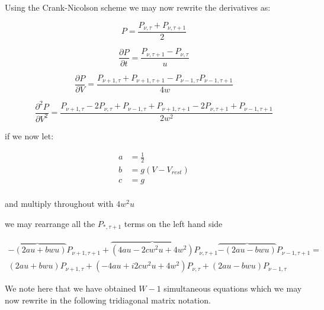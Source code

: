 \documentclass[10pt]{article}
\begin{document}
Using the Crank-Nicolson scheme we  may now rewrite the derivatives as:


\begin{equation}
    P = \frac{P_{\nu,\tau} + P_{\nu,\tau + 1}}{2}
\end{equation}

\begin{equation}
    \frac{\partial P}{\partial t} = \frac{P_{\nu,\tau +1 } -
    P_{\nu,\tau}}{u}
\end{equation}

\begin{equation}
    \frac{\partial P}{\partial V} = 
    \frac{P_{\nu +1,\tau } + P_{\nu +1,\tau +1 } -
    P_{\nu - 1,\tau } P_{\nu -1,\tau +1}}
    {4w}
\end{equation}

\begin{equation}
    \frac{\partial^2 P}{\partial V^2} = 
    \frac{P_{\nu+1,\tau} - 2 P_{\nu,\tau} + P_{\nu-1,\tau} +
    P_{\nu+1,\tau+1} - 2 P_{\nu,\tau+1} + P_{\nu-1,\tau+1}}
    {2w^2}
\end{equation}

if we now let:

\begin{align*}
a &= \frac{1}{2} \\
b &= g(V - V_{rest}) \\
c &= g \\
\end{align*}

and multiply throughout with $4w^2u$

we may rearrange all the $P_{*,\tau+1} $ terms on the left hand side

\begin{multline}
    \overbrace{-(2au+bwu)} P_{\nu+1,\tau+1} + 
    \overbrace{(4au - 2cw^2u + 4w^2)} P_{\nu,\tau+1} 
    \overbrace{-(2au-bwu)} P_{\nu-1,\tau+1} 
    =  \\
    (2au+bwu) P_{\nu+1,\tau} +  
    (-4au +i  2cw^2u + 4w^2) P_{\nu,\tau} + 
    (2au-bwu) P_{\nu-1,\tau} 
\end{multline}

We note here that we have obtained $W-1$ simultaneous equations which
we may now rewrite in the following tridiagonal matrix notation.
\end{document}

